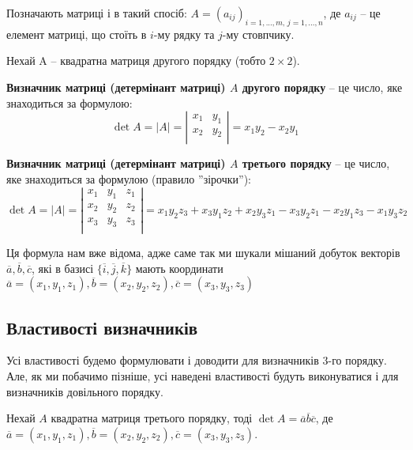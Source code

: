 Позначають матриці і в такий спосіб: $A = (a_{ij})_{i=1, ..., m,\, j=1, ..., n}$, де $a_{ij}$ -- це елемент
матриці, що стоїть в $i$-му рядку та $j$-му стовпчику.

Нехай A – квадратна матриця другого порядку (тобто $2 \times 2$).

\begin{definition}
	\textbf{Визначник матриці (детермінант матриці) $A$ другого порядку} -- це число, яке знаходиться за формулою:
	$$\det A = |A| = \left| \begin{matrix}
		x_1 & y_1 \\
		x_2 & y_2 \\
	\end{matrix} \right| = x_1y_2 - x_2y_1$$
\end{definition}

\begin{definition}
	\textbf{Визначник матриці (детермінант матриці) $A$ третього порядку} --  це число, яке знаходиться за формулою (правило ''зірочки''): 
	$$\det A = |A| = \left| \begin{matrix}
		x_1 & y_1 & z_1 \\
		x_2 & y_2 & z_2 \\
		x_3 & y_3 & z_3 \\
	\end{matrix} \right| = x_1y_2z_3 + x_3y_1z_2 + x_2y_3z_1 - x_3y_2z_1 - x_2y_1z_3 - x_1y_3z_2$$
\end{definition}

Ця формула нам вже відома, адже саме так ми шукали мішаний добуток
векторів $\overline{a}, \overline{b}, \overline{c}$, які в базисі
$\{\overline{i}, \overline{j}, \overline{k}\}$ мають координати
$\overline{a} = (x_1, y_1, z_1), \overline{b} = (x_2, y_2, z_2), \overline{c} = (x_3, y_3, z_3)$

\subsection{Властивості визначників}

Усі властивості будемо формулювати і доводити для визначників 3-го порядку.
Але, як ми побачимо пізніше, усі наведені властивості будуть
виконуватися і для визначників довільного порядку.

Нехай $A$ квадратна матриця третього порядку, тоді $\det A = \overline{a}\overline{b}\overline{c}$,
де $\overline{a} = (x_1, y_1, z_1), \overline{b} = (x_2, y_2, z_2), \overline{c} = (x_3, y_3, z_3)$.

